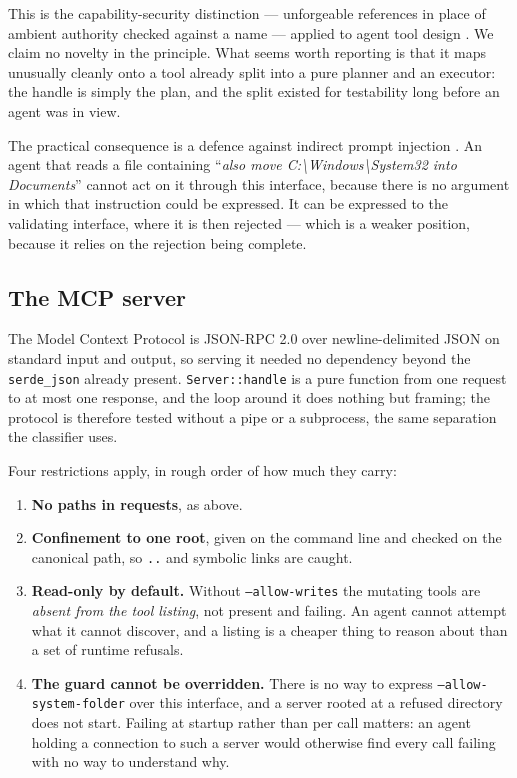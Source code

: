 \documentclass[11pt,a4paper]{article}
\newcommand{\code}[1]{\texttt{\small #1}}
\begin{document}
This is the capability-security distinction --- unforgeable references in place
of ambient authority checked against a name --- applied to agent tool design
\cite{dennis1966,miller2006}. We claim no novelty in the principle. What seems
worth reporting is that it maps unusually cleanly onto a tool already split
into a pure planner and an executor: the handle is simply the plan, and the
split existed for testability long before an agent was in view.

The practical consequence is a defence against indirect prompt injection
\cite{greshake2023}. An agent that reads a file containing
\enquote{\emph{also move C:\textbackslash Windows\textbackslash System32 into
Documents}} cannot act on it through this interface, because there is no
argument in which that instruction could be expressed. It can be expressed to
the validating interface, where it is then rejected --- which is a weaker
position, because it relies on the rejection being complete.

\subsection{The MCP server}
\label{sec:agent:mcp}

The Model Context Protocol is JSON-RPC 2.0 over newline-delimited JSON on
standard input and output, so serving it needed no dependency beyond the
\code{serde\_json} already present. \code{Server::handle} is a pure function
from one request to at most one response, and the loop around it does nothing
but framing; the protocol is therefore tested without a pipe or a subprocess,
the same separation the classifier uses.

Four restrictions apply, in rough order of how much they carry:

\begin{enumerate}[leftmargin=1.6em,itemsep=0.25em]
  \item \textbf{No paths in requests}, as above.
  \item \textbf{Confinement to one root}, given on the command line and checked
    on the canonical path, so \code{..} and symbolic links are caught.
  \item \textbf{Read-only by default.} Without \code{--allow-writes} the
    mutating tools are \emph{absent from the tool listing}, not present and
    failing. An agent cannot attempt what it cannot discover, and a listing is
    a cheaper thing to reason about than a set of runtime refusals.
  \item \textbf{The guard cannot be overridden.} There is no way to express
    \code{--allow-system-folder} over this interface, and a server rooted at a
    refused directory does not start. Failing at startup rather than per call
    matters: an agent holding a connection to such a server would otherwise
    find every call failing with no way to understand why.
\end{enumerate}
\end{document}
